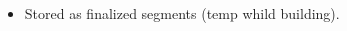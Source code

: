 \begin{multicols}{2}
\begin{itemize}
\begin{itemize}
    \begin{itemize}
        \item
      Stored as finalized segments (temp whild building).
    \end{itemize}
  \end{itemize}
\end{itemize}
\end{multicols}